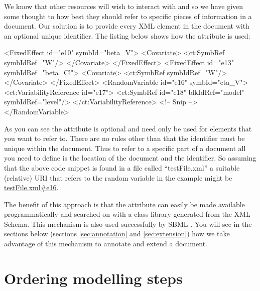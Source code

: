 We know that other resources will wish to interact with \pharmml and
so we have given some thought to how best they should refer to
specific pieces of information in a \pharmml document. Our solution is
to provide every XML element in the document with an optional unique
identifier. The listing below shows how the  attribute is
used:
%
\begin{xmlcode}
<FixedEffect id="e10" symbId="beta_V">
    <Covariate>
        <ct:SymbRef  symbIdRef="W"/>
    </Covariate>
</FixedEffect>
<FixedEffect id="e13" symbIdRef="beta_Cl">
    <Covariate>
        <ct:SymbRef symbIdRef="W"/>
    </Covariate>
</FixedEffect>
<RandomVariable id="e16" symbId="eta_V">
    <ct:VariabilityReference id="e17">
        <ct:SymbRef id="e18"  blkIdRef="model" symbIdRef="level"/>
   </ct:VariabilityReference>
   <!-- Snip -->
</RandomVariable>
\end{xmlcode}
%
As you can see the  attribute is optional and need only be
used for elements that you want to refer to. There are no rules other
than that the identifier must be unique within the \pharmml document.
Thus to refer to a specific part of a document all you need to define is
the location of the document and the identifier. So assuming that the
above code snippet is found in a file called ``testFile.xml'' a
suitable (relative) URI that refers to the random variable in the
example might be \url{testFile.xml#e16}.

The benefit of this approach is that the  attribute can
easily be made available programmatically and searched on with a class
library generated from the XML Schema.
This mechanism is also used successfully by SBML \cite[Section
6]{sbmll3v1c}. You will see in the sections below (sections \ref{sec:annotation} and
\ref{sec:extension}) how we take advantage of this mechanism to
annotate and extend a \pharmml document.

\section{Ordering modelling steps}

